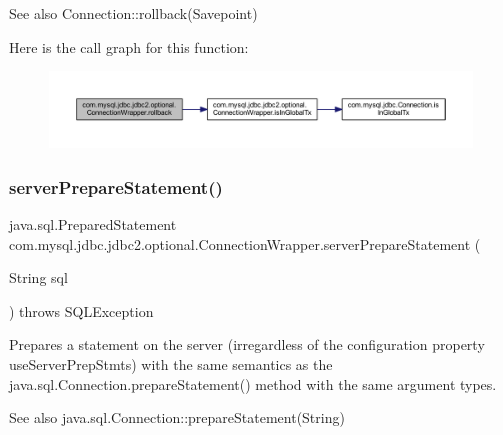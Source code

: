 \begin{DoxySeeAlso}{See also}
Connection\+::rollback(\+Savepoint) 
\end{DoxySeeAlso}
Here is the call graph for this function\+:
\nopagebreak
\begin{figure}[H]
\begin{center}
\leavevmode
\includegraphics[width=350pt]{classcom_1_1mysql_1_1jdbc_1_1jdbc2_1_1optional_1_1_connection_wrapper_aff1095ad260e93297f4318969655324f_cgraph}
\end{center}
\end{figure}
\mbox{\label{classcom_1_1mysql_1_1jdbc_1_1jdbc2_1_1optional_1_1_connection_wrapper_a75b41a04d4e8c60fd30e3ec13abccaa0}} 
\subsubsection{\texorpdfstring{server\+Prepare\+Statement()}{serverPrepareStatement()}\hspace{0.1cm}{\footnotesize\ttfamily [1/6]}}
{\footnotesize\ttfamily java.\+sql.\+Prepared\+Statement com.\+mysql.\+jdbc.\+jdbc2.\+optional.\+Connection\+Wrapper.\+server\+Prepare\+Statement (\begin{DoxyParamCaption}\item[{String}]{sql }\end{DoxyParamCaption}) throws S\+Q\+L\+Exception}

Prepares a statement on the server (irregardless of the configuration property \textquotesingle{}use\+Server\+Prep\+Stmts\textquotesingle{}) with the same semantics as the java.\+sql.\+Connection.\+prepare\+Statement() method with the same argument types.

\begin{DoxySeeAlso}{See also}
java.\+sql.\+Connection\+::prepare\+Statement(\+String) 
\end{DoxySeeAlso}


